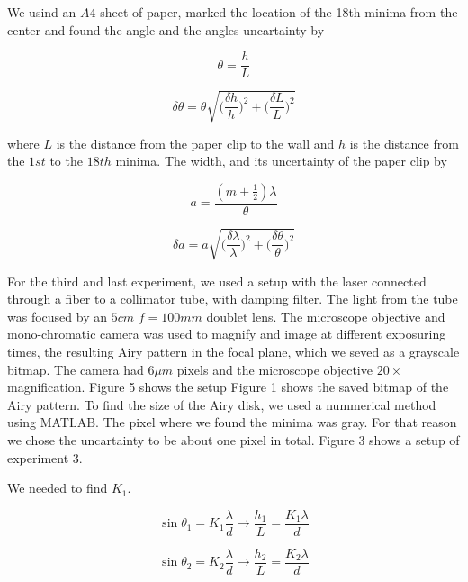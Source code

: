 \documentclass{emulateapj}
\begin{document}
We usind an $A4$ sheet of paper, marked the location of the 18th minima from the center and found the angle and the angles uncartainty by 

\begin{equation}
\theta = \frac{h}{L}
\end{equation}

\begin{equation}
\delta \theta = \theta\sqrt{\bigg (\frac{\delta h}{h}\bigg)^2 + \bigg (\frac{\delta L}{L}\bigg )^2}
\end{equation}

where $L$ is the distance from the paper clip to the wall and $h$ is the distance from the $1st$ to the $18th$ minima. The width, and its uncertainty of the paper clip by

\begin{equation}
a = \frac{(m + \frac{1}{2})\lambda}{\theta}
\end{equation}

\begin{equation}
\delta a = a\sqrt{\bigg (\frac{\delta \lambda}{\lambda}\bigg)^2 + \bigg (\frac{\delta \theta}{\theta}\bigg )^2}
\end{equation}


For the third and last experiment, we used a setup with the laser connected through a fiber to a collimator tube, with damping filter. The light from the tube was focused by an $5 cm$ $f = 100mm$ doublet lens. The microscope objective and mono-chromatic camera was used to magnify and image at different exposuring times, the resulting Airy pattern in the focal plane, which we seved as a grayscale bitmap. The camera had $6 \mu m$ pixels and the microscope objective $20\times$ magnification. Figure 5 shows the setup Figure 1 shows the saved bitmap of the Airy pattern. To find the size of the Airy disk, we used a nummerical method using MATLAB. The pixel where we found the minima was gray. For that reason we chose the uncartainty to be about one pixel in total. Figure 3 shows a setup of experiment 3.

We needed to find $K_1$.

\begin{equation}
\sin{\theta_1} = K_1\frac{\lambda}{d} \rightarrow \frac{h_1}{L} = \frac{K_1 \lambda}{d}
\end{equation}

\begin{equation}
\sin{\theta_2} = K_2\frac{\lambda}{d} \rightarrow \frac{h_2}{L} = \frac{K_2 \lambda}{d}
\end{equation}
\end{document}
